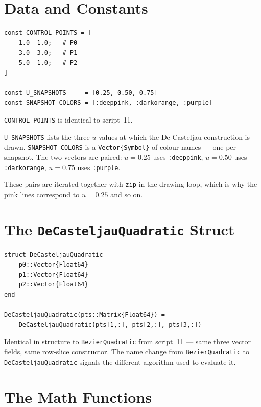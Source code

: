 \documentclass[12pt, a4paper]{article}
\newcommand{\cd}[1]{\texttt{#1}}
\begin{document}
\section{Data and Constants}

\begin{verbatim}
const CONTROL_POINTS = [
    1.0  1.0;   # P0
    3.0  3.0;   # P1
    5.0  1.0;   # P2
]

const U_SNAPSHOTS     = [0.25, 0.50, 0.75]
const SNAPSHOT_COLORS = [:deeppink, :darkorange, :purple]
\end{verbatim}

\cd{CONTROL\_POINTS} is identical to script~11.

\cd{U\_SNAPSHOTS} lists the three $u$ values at which the
De Casteljau construction is drawn.
\cd{SNAPSHOT\_COLORS} is a \cd{Vector\{Symbol\}} of
colour names --- one per snapshot.
The two vectors are paired: $u=0.25$ uses \cd{:deeppink},
$u=0.50$ uses \cd{:darkorange}, $u=0.75$ uses \cd{:purple}.

These pairs are iterated together with \cd{zip} in the
drawing loop, which is why the pink lines correspond to
$u=0.25$ and so on.


\section{The \texttt{DeCasteljauQuadratic} Struct}

\begin{verbatim}
struct DeCasteljauQuadratic
    p0::Vector{Float64}
    p1::Vector{Float64}
    p2::Vector{Float64}
end

DeCasteljauQuadratic(pts::Matrix{Float64}) =
    DeCasteljauQuadratic(pts[1,:], pts[2,:], pts[3,:])
\end{verbatim}

Identical in structure to \cd{BezierQuadratic} from
script~11 --- same three vector fields, same row-slice
constructor.
The name change from \cd{BezierQuadratic} to
\cd{DeCasteljauQuadratic} signals the different algorithm
used to evaluate it.


\section{The Math Functions}
\end{document}

